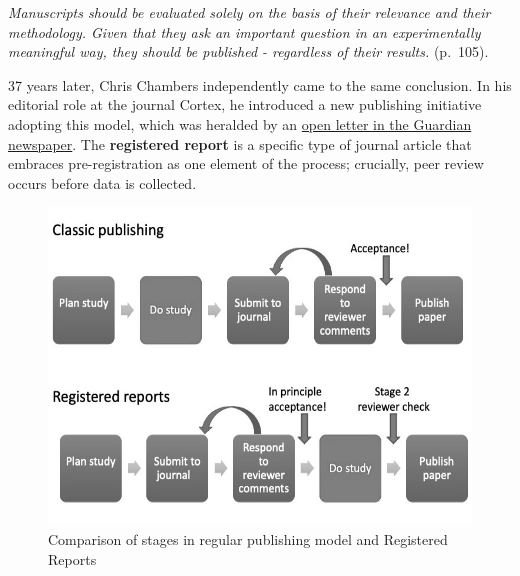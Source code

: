 \documentclass{krantz}
\begin{document}
\emph{Manuscripts should be evaluated solely on the basis of their relevance and their methodology. Given that they ask an important question in an experimentally meaningful way, they should be published - regardless of their results.} (p.~105).

37 years later, Chris Chambers independently came to the same conclusion. In his editorial role at the journal Cortex, he introduced a new publishing initiative adopting this model, which was heralded by an \href{https://www.theguardian.com/science/blog/2013/jun/05/trust-in-science-study-pre-registration}{open letter in the Guardian newspaper}. The \textbf{registered report} is a specific type of journal article that embraces pre-registration as one element of the process; crucially, peer review occurs before data is collected.

\begin{figure}

{\centering \includegraphics[width=0.75\linewidth]{images_bw/RR_compare_regularpublishing} 

}

\caption{Comparison of stages in regular publishing model and Registered Reports}\label{fig:RRcompare}
\end{figure}
\end{document}
